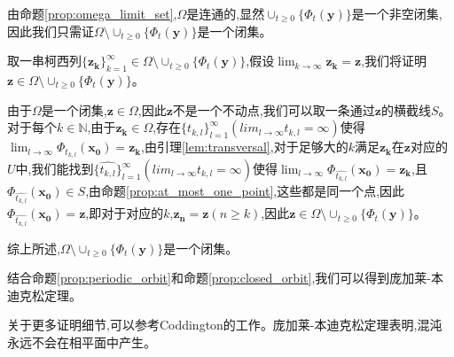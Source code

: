 \begin{pf}
    由命题\ref{prop:omega_limit_set},$\Omega$是连通的,显然$\cup_{t\geq 0}\{\Phi_t(\mathbf{y})\}$是一个非空闭集,因此我们只需证$\Omega\setminus\cup_{t\geq 0}\{\Phi_t(\mathbf{y})\}$是一个闭集。

    取一串柯西列$\{\mathbf{z_k}\}_{k=1}^{\infty}\in \Omega\setminus\cup_{t\geq 0}\{\Phi_t(\mathbf{y})\}$,假设$\lim_{k\to\infty}\mathbf{z_k}=\mathbf{z}$,我们将证明$\mathbf{z}\in \Omega\setminus\cup_{t\geq 0}\{\Phi_t(\mathbf{y})\}$。

    由于$\Omega$是一个闭集,$\mathbf{z}\in \Omega$,因此$\mathbf{z}$不是一个不动点,我们可以取一条通过$\mathbf{z}$的横截线$S$。对于每个$k\in\mathbb{N}$,由于$\mathbf{z_k}\in\Omega$,存在$\{t_{k,l}\}_{l=1}^{\infty}(lim_{l\to\infty}t_{k,l}=\infty)$使得$\lim_{l\to\infty}\Phi_{t_{k,l}}(\mathbf{x_0})=\mathbf{z_k}$,由引理\ref{lem:transversal},对于足够大的$k$满足$\mathbf{z_k}$在$\mathbf{z}$对应的$U$中,我们能找到$\{\hat{t_{k,l}}\}_{l=1}^{\infty}(lim_{l\to\infty}\hat{t_{k,l}}=\infty)$使得$\lim_{l\to\infty}\Phi_{\hat{t_{k,l}}}(\mathbf{x_0})=\mathbf{z_k}$,且$\Phi_{\hat{t_{k,l}}}(\mathbf{x_0})\in S$,由命题\ref{prop:at_most_one_point},这些都是同一个点,因此$\Phi_{\hat{t_{k,l}}}(\mathbf{x_0})=\mathbf{z}$,即对于对应的$k$,$\mathbf{z_n}=\mathbf{z}(n\geq k)$,因此$\mathbf{z}\in \Omega\setminus\cup_{t\geq 0}\{\Phi_t(\mathbf{y})\}$。

    综上所述,$\Omega\setminus\cup_{t\geq 0}\{\Phi_t(\mathbf{y})\}$是一个闭集。
\end{pf}
结合命题\ref{prop:periodic_orbit}和命题\ref{prop:closed_orbit},我们可以得到庞加莱-本迪克松定理。

关于更多证明细节,可以参考Coddington的工作\cite{coddington1956theory}。庞加莱-本迪克松定理表明,混沌永远不会在相平面中产生\cite{strogatz2018nonlinear}。
